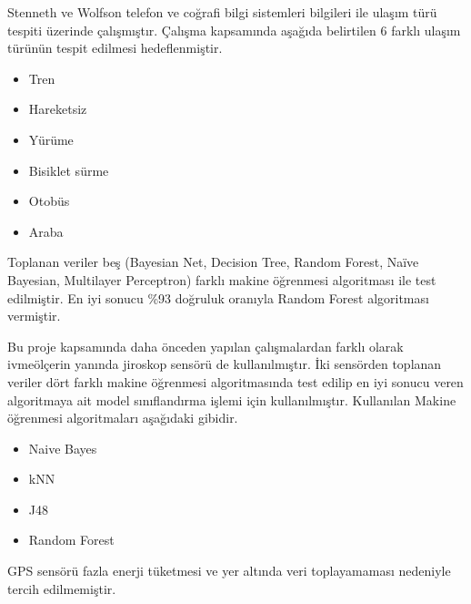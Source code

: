 Stenneth ve Wolfson \cite{stenneth2011transportation} telefon ve coğrafi bilgi sistemleri bilgileri ile ulaşım türü tespiti üzerinde çalışmıştır. Çalışma kapsamında aşağıda belirtilen 6 farklı ulaşım türünün tespit edilmesi hedeflenmiştir.
\begin{itemize}
  \item Tren
  \item Hareketsiz
  \item Yürüme
  \item Bisiklet sürme
  \item Otobüs
  \item Araba
\end{itemize}
Toplanan veriler beş (Bayesian Net, Decision Tree, Random Forest, Naïve Bayesian, Multilayer Perceptron) farklı makine öğrenmesi algoritması ile test edilmiştir. En iyi sonucu \%93 doğruluk oranıyla Random Forest algoritması vermiştir.
\newpage

Bu proje kapsamında daha önceden yapılan çalışmalardan farklı olarak ivmeölçerin yanında jiroskop sensörü de kullanılmıştır. İki sensörden toplanan veriler dört farklı makine öğrenmesi algoritmasında test edilip en iyi sonucu veren algoritmaya ait model sınıflandırma işlemi için kullanılmıştır. 
Kullanılan Makine öğrenmesi algoritmaları aşağıdaki gibidir.
\begin{itemize}
  \item Naive Bayes
  \item kNN
  \item J48
  \item Random Forest
\end{itemize}
GPS sensörü fazla enerji tüketmesi ve yer altında veri toplayamaması nedeniyle tercih edilmemiştir.











